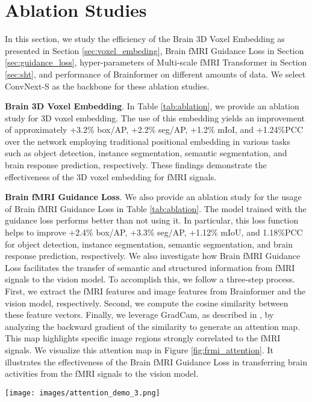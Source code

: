 \section{Ablation Studies}

In this section, we study the efficiency of the Brain 3D Voxel Embedding as presented in Section \ref{sec:voxel_embeding}, Brain fMRI Guidance Loss in Section \ref{sec:guidance_loss}, hyper-parameters of Multi-scale fMRI Transformer in Section \ref{sec:sht}, and performance of Brainformer on different amounts of data. We select ConvNext-S as the backbone for these ablation studies. 

\noindent
\textbf{Brain 3D Voxel Embedding}.
In Table \ref{tab:ablation}, we provide an ablation study for 3D voxel embedding. The use of this embedding yields an improvement of approximately +3.2\% box/AP, +2.2\% seg/AP, +1.2\% mIoI, and +1.24\%PCC over the network employing traditional positional embedding in various tasks such as object detection, instance segmentation, semantic segmentation, and brain response prediction, respectively. These findings demonstrate the effectiveness of the 3D voxel embedding for fMRI signals.

\noindent
\textbf{Brain fMRI Guidance Loss}.
We also provide an ablation study for the usage of Brain fMRI Guidance Loss in Table \ref{tab:ablation}. The model trained with the guidance loss performs better than not using it. In particular, this loss function helps to improve +2.4\% box/AP, +3.3\% seg/AP, +1.12\% mIoU, and 1.18\%PCC for object detection, instance segmentation, semantic segmentation, and brain response prediction, respectively. We also investigate how Brain fMRI Guidance Loss facilitates the transfer of semantic and structured information from fMRI signals to the vision model. To accomplish this, we follow a three-step process. First, we extract the fMRI features and image features from Brainformer and the vision model, respectively. Second, we compute the cosine similarity between these feature vectors. Finally, we leverage GradCam, as described in \cite{grad_cam}, by analyzing the backward gradient of the similarity to generate an attention map. This map highlights specific image regions strongly correlated to the fMRI signals. We visualize this attention map in Figure \ref{fig:frmi_attention}. 
It illustrates the effectiveness of the Brain fMRI Guidance Loss in transferring brain activities from the fMRI signals to the vision model.

\begin{figure*}[!t]
    \centering
    \texttt{[image: images/attention\_demo\_3.png]}
    \vspace{-3mm}
    \caption{Visual attention with respect to fMRI signals. 
    The first row is the input images. The second row is the corresponding attention maps of the vision model training with CLIP. The third row is the results of training with Brainformer without {Brain fMRI Guidance Loss}. The last row is the results with Brainformer and guidance of {Brain fMRI Guidance Loss}. \textbf{Best view in color}.}
    \vspace{-5mm}
    \label{fig:frmi_attention}
\end{figure*}

